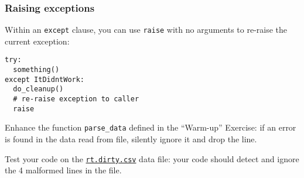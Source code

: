 \documentclass[english,serif,mathserif,xcolor=pdftex,dvipsnames,table]{beamer}
\begin{document}
\begin{frame}[fragile]
  \frametitle{Raising exceptions}
  Within an \lstinline|except| clause, you can use \lstinline|raise|
  with no arguments to re-raise the current exception:
\begin{lstlisting}
try:
  something()
except ItDidntWork:
  do_cleanup()
  # re-raise exception to caller
  raise
\end{lstlisting}
\end{frame}


\begin{frame}[fragile]
  \begin{exercise}
    Enhance the function \lstinline|parse_data| defined in the ``Warm-up''
    Exercise: if an error is found in the data read from file,
    silently ignore it and drop the line.

    Test your code on the
    \href{https://raw.github.com/gc3-uzh-ch/python-course/master/rt.tsv}{\texttt{rt.dirty.csv}}
    data file: your code should detect and ignore the 4 malformed
    lines in the file.
  \end{exercise}
\end{frame}
\end{document}

